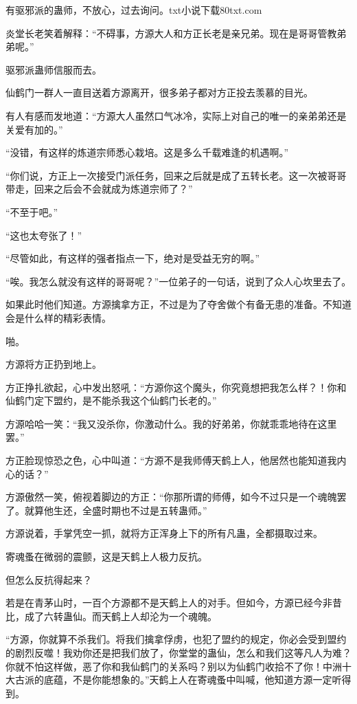 \begin{this_body}
有驱邪派的蛊师，不放心，过去询问。txt小说下载80txt.com

炎堂长老笑着解释：“不碍事，方源大人和方正长老是亲兄弟。现在是哥哥管教弟弟呢。”

驱邪派蛊师信服而去。

仙鹤门一群人一直目送着方源离开，很多弟子都对方正投去羡慕的目光。

有人有感而发地道：“方源大人虽然口气冰冷，实际上对自己的唯一的亲弟弟还是关爱有加的。”

“没错，有这样的炼道宗师悉心栽培。这是多么千载难逢的机遇啊。”

“你们说，方正上一次接受门派任务，回来之后就是成了五转长老。这一次被哥哥带走，回来之后会不会就成为炼道宗师了？”

“不至于吧。”

“这也太夸张了！”

“尽管如此，有这样的强者指点一下，绝对是受益无穷的啊。”

“唉。我怎么就没有这样的哥哥呢？”一位弟子的一句话，说到了众人心坎里去了。

如果此时他们知道。方源擒拿方正，不过是为了夺舍做个有备无患的准备。不知道会是什么样的精彩表情。

啪。

方源将方正扔到地上。

方正挣扎欲起，心中发出怒吼：“方源你这个魔头，你究竟想把我怎么样？！你和仙鹤门定下盟约，是不能杀我这个仙鹤门长老的。”

方源哈哈一笑：“我又没杀你，你激动什么。我的好弟弟，你就乖乖地待在这里罢。”

方正脸现惊恐之色，心中叫道：“方源不是我师傅天鹤上人，他居然也能知道我内心的话？”

方源傲然一笑，俯视着脚边的方正：“你那所谓的师傅，如今不过只是一个魂魄罢了。就算他生还，全盛时期也不过是五转蛊师。”

方源说着，手掌凭空一抓，就将方正浑身上下的所有凡蛊，全都摄取过来。

寄魂蚤在微弱的震颤，这是天鹤上人极力反抗。

但怎么反抗得起来？

若是在青茅山时，一百个方源都不是天鹤上人的对手。但如今，方源已经今非昔比，成了六转蛊仙。而天鹤上人却沦为一个魂魄。

“方源，你就算不杀我们。将我们擒拿俘虏，也犯了盟约的规定，你必会受到盟约的剧烈反噬！我劝你还是把我们放了，你堂堂的蛊仙，怎么和我们这等凡人为难？你就不怕这样做，恶了你和我仙鹤门的关系吗？别以为仙鹤门收拾不了你！中洲十大古派的底蕴，不是你能想象的。”天鹤上人在寄魂蚤中叫喊，他知道方源一定听得到。


\end{this_body}

